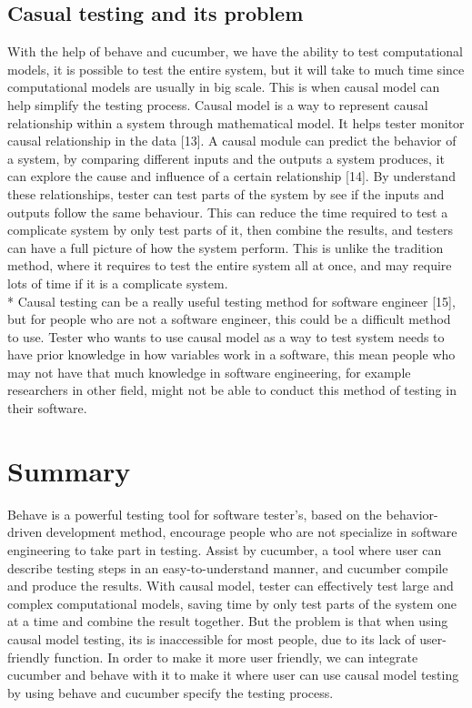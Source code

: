 \subsection{Casual testing and its problem}
With the help of behave and cucumber, we have the ability to test computational models, it is possible to test the entire system, but it will take to much time since computational models are usually in big scale. This is when causal model can help simplify the testing process. Causal model is a way to represent causal relationship within a system through mathematical model. It helps tester monitor causal relationship in the data [13]. A causal module can predict the behavior of a system, by comparing different inputs and the outputs a system produces, it can explore the cause and influence of a certain relationship [14]. By understand these relationships, tester can test parts of the system by see if the inputs and outputs follow the same behaviour. This can reduce the time required to test a complicate system by only test parts of it, then combine the results, and testers can have a full picture of how the system perform. This is unlike the tradition method, where it requires to test the entire system all at once, and may require lots of time if it is a complicate system.\\*
Causal testing can be a really useful testing method for software engineer [15], but for people who are not a software engineer, this could be a difficult method to use. Tester who wants to use causal model as a way to test system needs to have prior knowledge in how variables work in a software, this mean people who may not have that much knowledge in software engineering, for example researchers in other field, might not be able to conduct this method of testing in their software. 


\section{Summary}

Behave is a powerful testing tool for software tester’s, based on the behavior-driven development method, encourage people who are not specialize in software engineering to take part in testing. Assist by cucumber, a tool where user can describe testing steps in an easy-to-understand manner, and cucumber compile and produce the results. With causal model, tester can effectively test large and complex computational models, saving time by only test parts of the system one at a time and combine the result together. But the problem is that when using causal model testing, its is inaccessible for most people, due to its lack of user-friendly function. In order to make it more user friendly, we can integrate cucumber and behave with it to make it where user can use causal model testing by using behave and cucumber specify the testing process.
